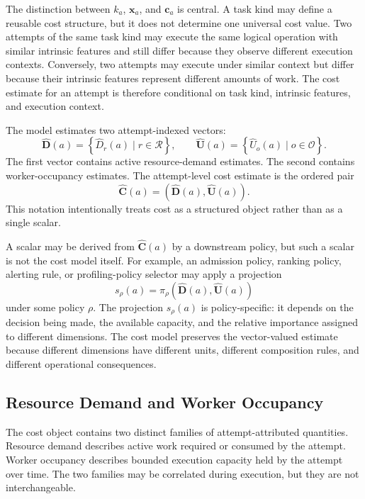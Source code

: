 The distinction between $k_a$, $\mathbf{x}_a$, and $\mathbf{c}_a$ is central. A
task kind may define a reusable cost structure, but it does not determine one
universal cost value. Two attempts of the same task kind may execute the same
logical operation with similar intrinsic features and still differ because they
observe different execution contexts. Conversely, two attempts may execute under
similar context but differ because their intrinsic features represent different
amounts of work. The cost estimate for an attempt is therefore conditional on
task kind, intrinsic features, and execution context.

The model estimates two attempt-indexed vectors:
\[
\widehat{\mathbf{D}}(a)
=
\left\{
\widehat{D}_r(a)
\mid
r \in \mathcal{R}
\right\},
\qquad
\widehat{\mathbf{U}}(a)
=
\left\{
\widehat{U}_o(a)
\mid
o \in \mathcal{O}
\right\}.
\]
The first vector contains active resource-demand estimates. The second contains
worker-occupancy estimates. The attempt-level cost estimate is the ordered pair
\[
\widehat{\mathbf{C}}(a)
=
\left(
\widehat{\mathbf{D}}(a),
\widehat{\mathbf{U}}(a)
\right).
\]
This notation intentionally treats cost as a structured object rather than as a
single scalar.

A scalar may be derived from $\widehat{\mathbf{C}}(a)$ by a downstream policy,
but such a scalar is not the cost model itself. For example, an admission policy,
ranking policy, alerting rule, or profiling-policy selector may apply a
projection
\[
s_\rho(a)
=
\pi_\rho\!\left(
\widehat{\mathbf{D}}(a),
\widehat{\mathbf{U}}(a)
\right)
\]
under some policy $\rho$. The projection $s_\rho(a)$ is policy-specific: it
depends on the decision being made, the available capacity, and the relative
importance assigned to different dimensions. The cost model preserves the
vector-valued estimate because different dimensions have different units,
different composition rules, and different operational consequences.

\subsection{Resource Demand and Worker Occupancy}
\label{sec:cost-demand-occupancy}

The cost object contains two distinct families of attempt-attributed quantities.
Resource demand describes active work required or consumed by the attempt.
Worker occupancy describes bounded execution capacity held by the attempt over
time. The two families may be correlated during execution, but they are not
interchangeable.

